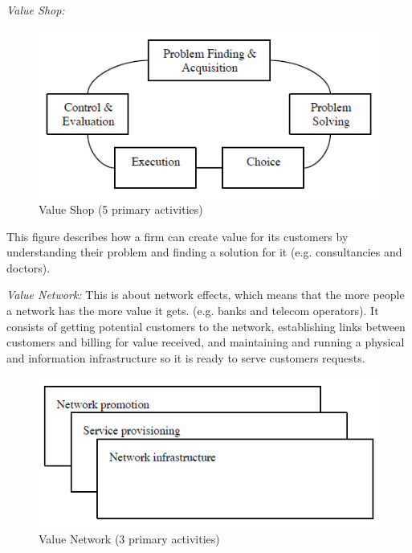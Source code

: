 \bigskip
\emph{Value Shop:}
\begin{figure}[h]
\caption[ValueShop]{Value Shop (5 primary activities) \cite{osterwalderthesis}}
\label{fig:ValueShop}
\begin{center}
\includegraphics[scale=0.8]{valueshopnew}
\end{center}
\end{figure}

This figure describes how a firm can create value for its customers by understanding their problem and finding a solution for it (e.g. consultancies and doctors).

\emph{Value Network:}
This is about network effects, which means that the more people a network has the more value it gets. (e.g. banks and telecom operators). It consists of getting potential customers to the network, establishing links between customers and billing for value received, and maintaining and running a physical and information infrastructure so it is ready to serve customers requests. 

\begin{figure}[h]
\caption[ValueNetwork]{Value Network (3 primary activities) \cite{osterwalderthesis}}
\label{fig:ValueNetwork}
\begin{center}
\includegraphics[scale=0.7]{valuenetworknew}
\end{center}
\end{figure}

